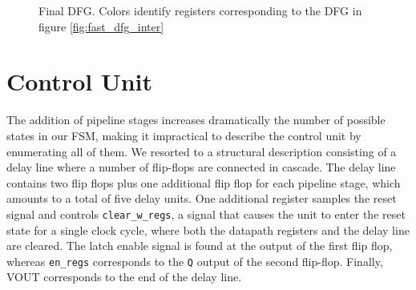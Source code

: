 \begin{figure}
	\caption{Final DFG. Colors identify registers corresponding to the DFG in figure \autoref{fig:fast_dfg_inter}}
	\label{fig:fast_dfg_final}
\end{figure}

\section{Control Unit}
The addition of pipeline stages increases dramatically the number of possible states in our FSM, making it impractical to describe the control unit by enumerating all of them. We resorted to a structural description consisting of a delay line where a number of flip-flops are connected in cascade. The delay line contains two flip flops plus one additional flip flop for each pipeline stage, which amounts to a total of five delay units. One additional register samples the reset signal and controls \texttt{clear\_w\_regs}, a signal that causes the unit to enter the reset state for a single clock cycle, where both the datapath registers and the delay line are cleared. The latch enable signal is found at the output of the first flip flop, whereas \texttt{en\_regs} corresponds to the \texttt{Q} output of the second flip-flop. Finally, VOUT corresponds to the end of the delay line.
